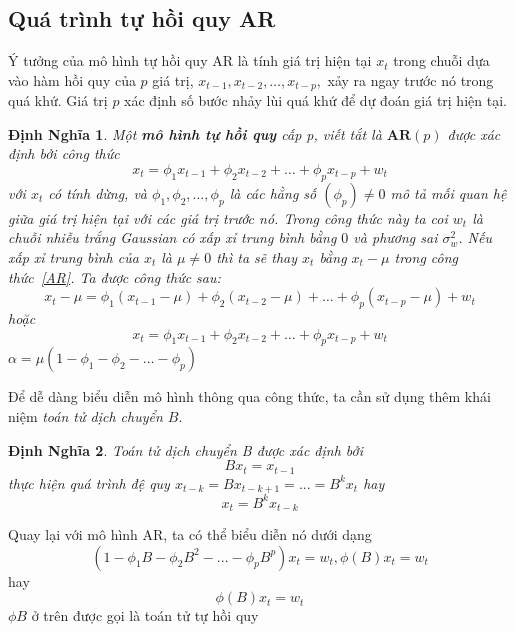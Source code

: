 \documentclass[twoside,12pt]{Latex/Classes/PhDthesisPSnPDF}
\newtheorem{defi}{Định Nghĩa}[chapter]
\begin{document}
\subsection{Quá trình tự hồi quy AR}
	Ý tưởng của mô hình tự hồi quy AR là tính giá trị hiện tại $x_t$ trong chuỗi dựa vào hàm hồi quy của $p$ giá trị, $x_{t-1},x_{t-2},\dots,x_{t-p},$ xảy ra ngay trước nó trong quá khứ. Giá trị $p$ xác định số bước nhảy lùi quá khứ để dự đoán giá trị hiện tại. 
	\begin{defi} Một \textbf{mô hình tự hồi quy} cấp p, viết tắt là $\textbf{AR}(p)$ được xác định bởi công thức 
			\begin{equation}\label{AR}			
			x_t = \phi_1x_{t-1} + \phi_2x_{t-2} + \dots + \phi_px_{t-p} + w_t
			\end{equation}
			với $x_t$ có tính dừng, và $\phi_1, \phi_2,\dots,\phi_p$ là các hằng số $(\phi_p)\neq 0$ mô tả mối quan hệ giữa giá trị hiện tại với các giá trị trước nó. Trong công thức này ta coi $w_t$ là chuỗi nhiễu trắng Gaussian có xấp xỉ trung bình bằng $0$ và phương sai $\sigma^2_w$. Nếu xấp xỉ trung bình của $x_t$ là $\mu \neq 0$ thì ta sẽ thay $x_t$ bằng $x_t - \mu$ trong công thức~\ref{AR}. Ta được công thức sau:
			\begin{equation}\label{AR}			
			x_t-\mu = \phi_1(x_{t-1}-\mu) + \phi_2(x_{t-2}-\mu) + \dots + \phi_p(x_{t-p}-\mu) + w_t 
			\end {equation}
			hoặc
			\begin{equation}
			x_t = \phi_1x_{t-1} + \phi_2x_{t-2} + \dots + \phi_px_{t-p} + w_t 
			\end{equation}
			 $ \alpha = \mu (1-\phi_1 - \phi_2-\dots- \phi_p)	$
	\end{defi}

Để dễ dàng biểu diễn mô hình thông qua công thức, ta cần sử dụng thêm khái niệm \textit{toán tử dịch chuyển $B$}.
\begin{defi}
	Toán tử dịch chuyển B được xác định bởi
	\begin{equation}
		Bx_t = x_{t-1}
	\end{equation}
	thực hiện quá trình đệ quy $x_{t-k}=Bx_{t-k+1}=...=B^kx_t$ hay
	\begin{equation}
		x_{t} = B^kx_{t-k}
	\end{equation}
\end{defi}
Quay lại với mô hình AR, ta có thể biểu diễn nó dưới dạng
\begin{equation}
	(1-\phi_1B-\phi_2B^{2}-...-\phi_pB^{p})x_t = w_t, 
	\phi(B)x_t=w_t
\end{equation}
hay
\begin{equation} 
	\phi(B)x_t=w_t
\end{equation}
$\phi B$ ở trên được gọi là toán tử tự hồi quy
\end{document}
